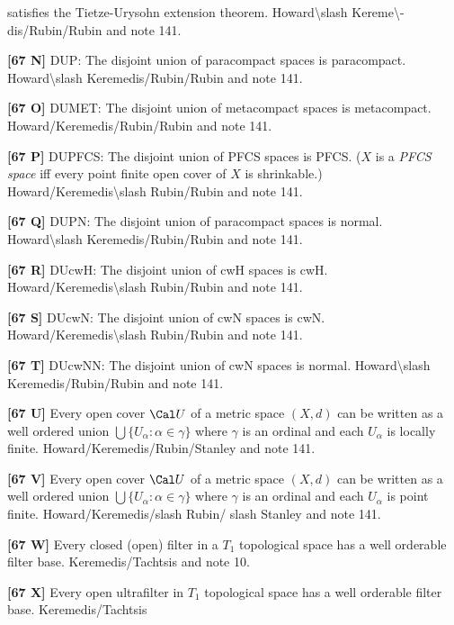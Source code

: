 satisfies the Tietze-Urysohn extension theorem.
\ac{Howard\slash Kereme\-dis/Rubin/Rubin} \cite{1998a} and note 141.
\smallskip
\item{}{\bf [67 N]} DUP: The disjoint union of paracompact spaces is
paracompact. \ac{Howard\slash Keremedis/Rubin/Rubin} \cite{1998b} and
note 141.
\smallskip
\item{}{\bf [67 O]} DUMET: The disjoint union of metacompact spaces is
metacompact. \ac{Howard/Keremedis/Rubin/Rubin} \cite{1998b} and note 141.
\smallskip
\item{}{\bf [67 P]} DUPFCS: The disjoint union of PFCS spaces is PFCS.
($X$ is a {\it PFCS space} iff every point finite open cover of $X$ is
shrinkable.) \ac{Howard/Keremedis\slash Rubin/Rubin} \cite{1998b} and
note 141.
\smallskip
\item{}{\bf [67 Q]} DUPN: The disjoint union of paracompact spaces is
normal. \ac{Howard\slash Keremedis/Rubin/Rubin} \cite{1998b} and note 141.
\smallskip
\item{}{\bf [67 R]} DUcwH: The disjoint union of cwH spaces is cwH.
\ac{Howard/Keremedis\slash Rubin/Rubin} \cite{1998b} and note 141.
\smallskip
\item{}{\bf [67 S]} DUcwN: The disjoint union of cwN spaces is cwN.
\ac{Howard/Keremedis\slash Rubin/Rubin} \cite{1998b} and note 141.
\smallskip
\smallskip
\item{}{\bf [67 T]} DUcwNN: The disjoint union of cwN spaces is normal.
\ac{Howard\slash Keremedis/Rubin/Rubin} \cite{1998b} and note 141.
\smallskip
\item{}{\bf [67 U]} Every open cover $\Cal U$ of a metric space $(X,d)$ can
be written as a well ordered union $\bigcup \{U_\alpha : \alpha\in\gamma\}$
where $\gamma$ is an ordinal and each $U_\alpha$ is locally finite.
\ac{Howard/Keremedis/Rubin/Stanley} \cite{1999} and note 141.
\smallskip
\item{}{\bf [67 V]} Every open cover $\Cal U$ of a metric space $(X,d)$ can
be written as a well ordered union $\bigcup \{U_\alpha : \alpha\in\gamma\}$
where $\gamma$ is an ordinal and each $U_\alpha$ is point finite.
\ac{Howard/Keremedis/slash Rubin/ slash Stanley} \cite{1999} and note 141.
\smallskip
\item{}{\bf [67 W]} Every closed (open) filter in a $T_1$ topological
space has a well orderable filter base.  \ac{Keremedis/Tachtsis}
\cite{1999b} and note 10.
\smallskip
\item{}{\bf [67 X]} Every open ultrafilter in $T_1$ topological space
has a well orderable filter base.  \ac{Keremedis/Tachtsis} \cite{1999b}
